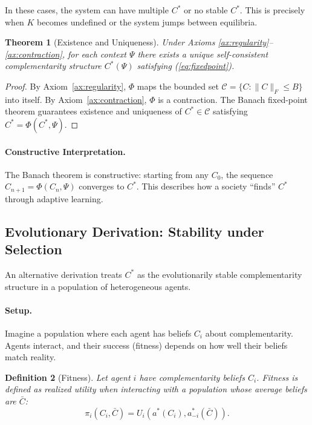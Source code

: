\documentclass[12pt,a4paper]{article}
\newtheorem{theorem}{Theorem}[section]
\newtheorem{definition}[theorem]{Definition}
\begin{document}
In these cases, the system can have multiple $C^*$ or no stable $C^*$.
This is precisely when $K$ becomes undefined or the system jumps between equilibria.

\begin{theorem}[Existence and Uniqueness]
\label{thm:existence}
Under Axioms \ref{ax:regularity}--\ref{ax:contraction}, 
for each context $\Psi$ there exists a unique self-consistent 
complementarity structure $C^*(\Psi)$ satisfying (\ref{eq:fixedpoint}).
\end{theorem}

\begin{proof}
By Axiom~\ref{ax:regularity}, $\Phi$ maps the bounded set 
$\mathcal{C} = \{C : \|C\|_F \leq B\}$ into itself.
By Axiom~\ref{ax:contraction}, $\Phi$ is a contraction.
The Banach fixed-point theorem guarantees existence and uniqueness 
of $C^* \in \mathcal{C}$ satisfying $C^* = \Phi(C^*, \Psi)$.
\end{proof}

\paragraph{Constructive Interpretation.}
The Banach theorem is constructive: starting from any $C_0$,
the sequence $C_{n+1} = \Phi(C_n, \Psi)$ converges to $C^*$.
This describes how a society ``finds'' $C^*$ through adaptive learning.

\subsection{Evolutionary Derivation: Stability under Selection}

An alternative derivation \citep{bowles2004} treats $C^*$ as the evolutionarily stable 
complementarity structure in a population of heterogeneous agents.

\paragraph{Setup.}
Imagine a population where each agent has beliefs $C_i$ about complementarity.
Agents interact, and their success (fitness) depends on how well
their beliefs match reality.

\begin{definition}[Fitness]
Let agent $i$ have complementarity beliefs $C_i$.
Fitness is defined as realized utility when interacting 
with a population whose average beliefs are $\bar{C}$:
\[
  \pi_i(C_i, \bar{C}) = U_i(a^*(C_i), a^*_{-i}(\bar{C})).
\]
\end{definition}
\end{document}
